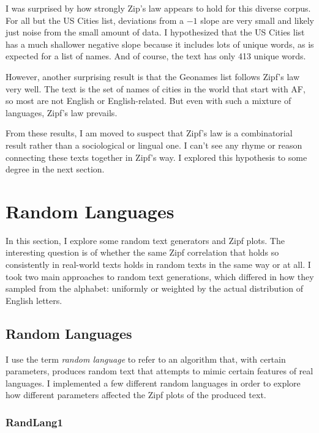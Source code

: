 \documentclass{article}
\begin{document}
I was surprised by how strongly Zip's law appears to hold for this diverse corpus. For all but the US Cities list, deviations from a $  -1  $ slope are very small and likely just noise from the small amount of data. I hypothesized that the US Cities list has a much shallower negative slope because it includes lots of unique words, as is expected for a list of names. And of course, the text has only 413 unique words.



However, another surprising result is that the Geonames list follows Zipf's law very well. The text is the set of names of cities in the world that start with AF, so most are not English or English-related. But even with such a mixture of languages, Zipf's law prevails.



From these results, I am moved to suspect that Zipf's law is a combinatorial result rather than a sociological or lingual one. I can't see any rhyme or reason connecting these texts together in Zipf's way. I explored this hypothesis to some degree in the next section.

\section{Random Languages}

In this section, I explore some random text generators and Zipf plots. The interesting question is of whether the same Zipf correlation that holds so consistently in real-world texts holds in random texts in the same way or at all. I took two main approaches to random text generations, which differed in how they sampled from the alphabet: uniformly or weighted by the actual distribution of English letters.

\subsection{Random Languages}

I use the term \textit{random language} to refer to an algorithm that, with certain parameters, produces random text that attempts to mimic certain features of real languages. I implemented a few different random languages in order to explore how different parameters affected the Zipf plots of the produced text.

\subsubsection{RandLang1}
\end{document}
